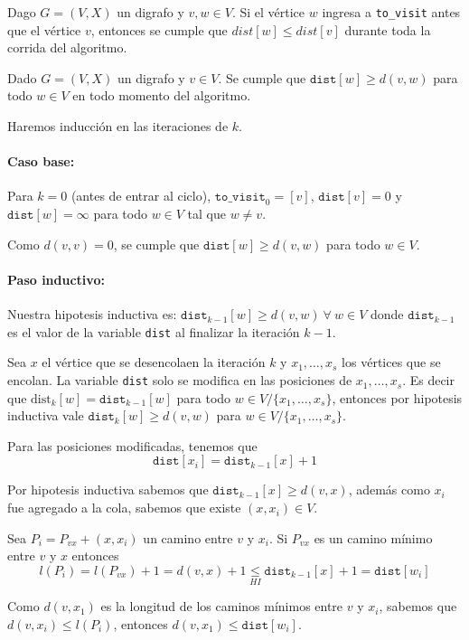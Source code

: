 \begin{coro}
  Dago \(G=(V,X)\) un digrafo y \(v,w\in V\). Si el vértice \(w\) ingresa a \texttt{to\_visit} antes que el vértice \(v\), entonces se cumple que \(dist[w]\leq dist[v]\) durante toda la corrida del algoritmo.
\end{coro}

\begin{lema}\label{lema::BFS::distMayorAd}
  Dado \(G=(V, X)\) un digrafo y \(v\in V\). Se cumple que \(\texttt{dist}[w]\geq d(v,w)\) para todo \(w\in V\) en todo momento del algoritmo.
\end{lema}

\begin{demo}
  Haremos inducción en las iteraciones de \(k\).

  \paragraph{Caso base:} Para \(k=0\) (antes de entrar al ciclo), \(\texttt{to\_visit}_0 = [v]\), \(\texttt{dist}[v] = 0\) y \(\texttt{dist}[w] = \infty\) para todo \(w\in V\) tal que \(w\neq v\).

  Como \(d(v,v) = 0\), se cumple que \(\texttt{dist}[w] \geq d(v,w)\) para todo \(w\in V\).

  \paragraph{Paso inductivo:} Nuestra hipotesis inductiva es: \(\texttt{dist}_{k-1}[w] \geq d(v,w)~\forall~w\in V\) donde \(\texttt{dist}_{k-1}\) es el valor de la variable \texttt{dist} al finalizar la iteración \(k-1\).

  Sea \(x\) el vértice que se desencolaen la iteración \(k\) y \(x_1,\dots,x_s\) los vértices que se encolan. La variable \texttt{dist} solo se modifica en las posiciones de \(x_1,\dots,x_s\). Es decir que \(\text{dist}_k[w] = \texttt{dist}_{k-1}[w]\) para todo \(w\in V / \{x_1,\dots,x_s\}\), entonces por hipotesis inductiva vale \(\texttt{dist}_k[w] \geq d(v,w)\) para \(w\in V / \{x_1,\dots,x_s\}\).

  Para las posiciones modificadas, tenemos que \[\texttt{dist}[x_i] = \texttt{dist}_{k-1}[x] + 1\]
\end{demo}
\begin{demoPart}
  Por hipotesis inductiva sabemos que \(\texttt{dist}_{k-1}[x] \geq d(v,x)\), además como \(x_i\) fue agregado a la cola, sabemos que existe \((x, x_i)\in V\).

  Sea \(P_{i} = P_{vx} + (x,x_i)\) un camino entre \(v\) y \(x_i\). Si \(P_{vx}\) es un camino mínimo entre \(v\) y \(x\) entonces \[l(P_{i}) = l(P_{vx}) + 1 = d(v,x) + 1 \underset{HI}{\leq} \texttt{dist}_{k-1}[x] + 1 = \texttt{dist}[w_i] \]

  Como \(d(v,x_1)\) es la longitud de los caminos mínimos entre \(v\) y \(x_i\), sabemos que \(d(v, x_i) \leq l(P_i)\), entonces \(d(v,x_1) \leq \texttt{dist}[w_i]\).
\end{demoPart}

